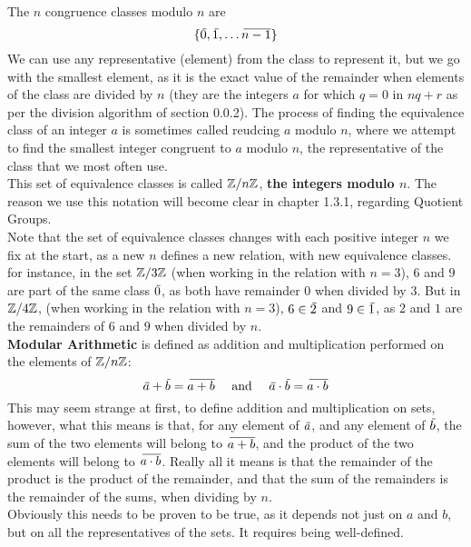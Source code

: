 \documentclass[12pt]{article}
\begin{document}
    The $n$ congruence classes modulo $n$ are
    \[ \{ \,\overline{\!{0}}, \,\overline{\!{1}}, \dots \,\overline{\!{n-1}} \} \]
    We can use any representative (element) from the class
    to represent it,
    but we go with the smallest element,
    as it is the exact value of the remainder
    when elements of the class are divided by $n$
    (they are the integers $a$ for which $q = 0$ in $nq + r$
    as per the division algorithm of section 0.0.2).
    The process of finding the equivalence class of an integer $a$
    is sometimes called reudcing $a$ modulo $n$,
    where we attempt to find
    the smallest integer congruent to $a$ modulo $n$,
    the representative of the class that we most often use. \\
    This set of equivalence classes is called $\mathbb{Z}/n\mathbb{Z}$,
    \textbf{the integers modulo $\mathbf{\textit{n}}$}.
    The reason we use this notation will become clear
    in chapter 1.3.1, regarding Quotient Groups. \\

    Note that the set of equivalence classes changes with
    each positive integer $n$ we fix at the start,
    as a new $n$ defines a new relation,
    with new equivalence classes.
    for instance, in the set $\mathbb{Z}/3\mathbb{Z}$
    (when working in the relation with $n = 3$),
    $6$ and $9$ are part of the same class $\,\overline{\!{0}}$,
    as both have remainder $0$ when divided by $3$. 
    But in $\mathbb{Z}/4\mathbb{Z}$,
    (when working in the relation with $n = 3$),
    $6 \in \,\overline{\!{2}}$ and $9 \in \,\overline{\!{1}}$,
    as $2$ and $1$ are the remainders of $6$ and $9$
    when divided by $n$. \\

    \textbf{Modular Arithmetic} is defined as addition and multiplication
    performed on the elements of $\mathbb{Z}/n\mathbb{Z}$:
    \[ \,\overline{\!{a}} + \,\overline{\!{b}} = \,\overline{\!{a + b}} 
    \quad \text{ and } \quad
    \,\overline{\!{a}} \cdot \,\overline{\!{b}} = \,\overline{\!{a \cdot b}} \]
    This may seem strange at first,
    to define addition and multiplication on sets,
    however,
    what this means is that,
    for any element of $\,\overline{\!{a}}$,
    and any element of $\,\overline{\!{b}}$,
    the sum of the two elements will belong to $\,\overline{\!{a + b}}$,
    and the product of the two elements
    will belong to $\,\overline{\!{a \cdot b}}$.
    Really all it means is that the remainder of the product
    is the product of the remainder,
    and that the sum of the remainders is the remainder of the sums,
    when dividing by $n$. \\
    Obviously this needs to be proven to be true,
    as it depends not just on $a$ and $b$,
    but on all the representatives of the sets. 
    It requires being well-defined. \\
\end{document}
